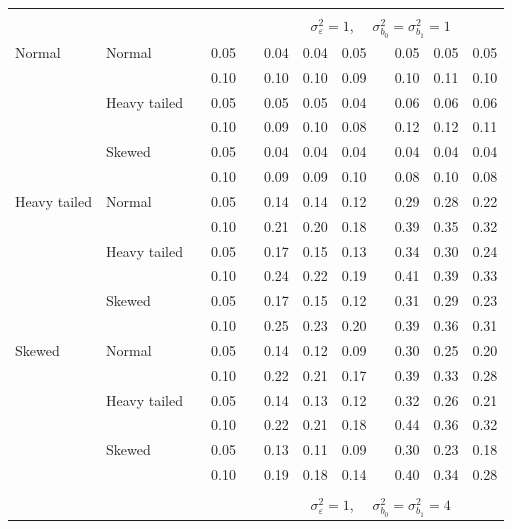 \documentclass[12pt]{article} %
\begin{document}
\begin{table}[ht]
\begin{scriptsize}
\begin{center}
\begin{tabular}{ll p{.1cm} c p{.1cm} rrr p{.1cm} rrr}
&&&&&&&&&&&\\
& && && \multicolumn{7}{c}{$\sigma_{\varepsilon}^2 = 1$, \ \ $\sigma_{b_0}^2 = \sigma_{b_1}^2 = 1$} \\ \cline{6-12}
Normal       & Normal       && 0.05 &&  0.04 & 0.04 & 0.05 && 0.05 & 0.05 & 0.05 \\ 
             &              && 0.10 &&  0.10 & 0.10 & 0.09 && 0.10 & 0.11 & 0.10 \\ 
             & Heavy tailed && 0.05 &&  0.05 & 0.05 & 0.04 && 0.06 & 0.06 & 0.06 \\ 
             &              && 0.10 &&  0.09 & 0.10 & 0.08 && 0.12 & 0.12 & 0.11 \\ 
             & Skewed       && 0.05 &&  0.04 & 0.04 & 0.04 && 0.04 & 0.04 & 0.04 \\ 
             &              && 0.10 &&  0.09 & 0.09 & 0.10 && 0.08 & 0.10 & 0.08 \\ 
Heavy tailed & Normal       && 0.05 &&  0.14 & 0.14 & 0.12 && 0.29 & 0.28 & 0.22 \\ 
             &              && 0.10 &&  0.21 & 0.20 & 0.18 && 0.39 & 0.35 & 0.32 \\ 
             & Heavy tailed && 0.05 &&  0.17 & 0.15 & 0.13 && 0.34 & 0.30 & 0.24 \\ 
             &              && 0.10 &&  0.24 & 0.22 & 0.19 && 0.41 & 0.39 & 0.33 \\ 
             & Skewed       && 0.05 &&  0.17 & 0.15 & 0.12 && 0.31 & 0.29 & 0.23 \\ 
             &              && 0.10 &&  0.25 & 0.23 & 0.20 && 0.39 & 0.36 & 0.31 \\ 
Skewed       & Normal       && 0.05 &&  0.14 & 0.12 & 0.09 && 0.30 & 0.25 & 0.20 \\ 
             &              && 0.10 &&  0.22 & 0.21 & 0.17 && 0.39 & 0.33 & 0.28 \\ 
             & Heavy tailed && 0.05 &&  0.14 & 0.13 & 0.12 && 0.32 & 0.26 & 0.21 \\ 
             &              && 0.10 &&  0.22 & 0.21 & 0.18 && 0.44 & 0.36 & 0.32 \\ 
             & Skewed       && 0.05 &&  0.13 & 0.11 & 0.09 && 0.30 & 0.23 & 0.18 \\ 
             &              && 0.10 &&  0.19 & 0.18 & 0.14 && 0.40 & 0.34 & 0.28 \\ 


&&&&&&&&&&&\\
& && && \multicolumn{7}{c}{$\sigma_{\varepsilon}^2 = 1$, \ \ $\sigma_{b_0}^2 = \sigma_{b_1}^2 = 4$} \\ \cline{6-12}

\hline
\end{tabular}
\end{center}
\end{scriptsize}
\end{table}
\end{document}
